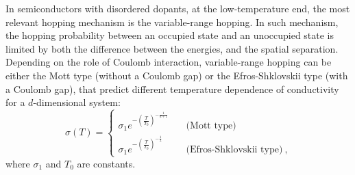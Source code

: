 In semiconductors with disordered dopants, at the low-temperature end, the most relevant hopping mechanism is the variable-range hopping. In such mechanism, the hopping probability between an occupied state and an unoccupied state is limited by both the difference between the energies, and the spatial separation. Depending on the role of Coulomb interaction, variable-range hopping can be either the Mott type (without a Coulomb gap) or the Efros-Shklovskii type (with a Coulomb gap), that predict different temperature dependence of conductivity for a $d$-dimensional system:%
\begin{equation}
    \sigma(T) = %
    \begin{cases}
        \sigma_1 e^{-\left(\frac{T}{T_0}\right)^{-\frac{1}{d+1}}}       & \quad \text{(Mott type)}\\
        \sigma_1 e^{-\left(\frac{T}{T_0}\right)^{-\frac{1}{2}}}  & \quad \text{(Efros-Shklovskii type)}~,
    \end{cases}\label{eq:vrh_types}
\end{equation}%
where $\sigma_1$ and $T_0$ are constants.

